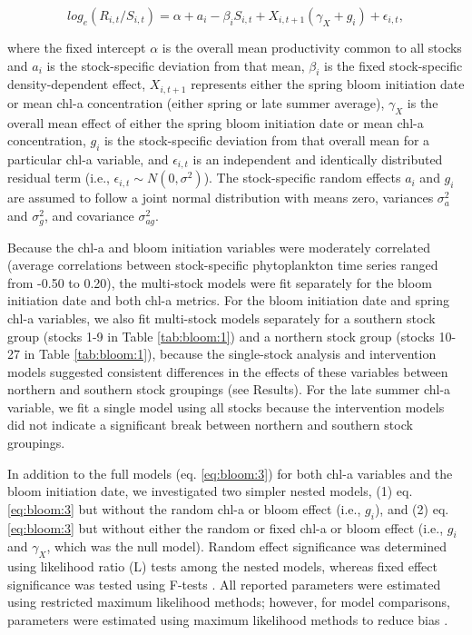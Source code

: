 \begin{equation}
log_e(R_{i,t}/S_{i,t}) = \alpha + a_i - \beta_iS_{i,t} + 
X_{i,t+1} (\gamma_{X} + g_{i}) + \epsilon_{i,t}, \label{eq:bloom:3}
\end{equation}

\noindent where the fixed intercept \(\alpha\) is the overall mean productivity
common to all stocks and \(a_i\) is the stock-specific deviation from that mean,
\(\beta_i\) is the fixed stock-specific density-dependent effect, \(X_{i,t+1}\)
represents either the spring bloom initiation date or mean chl-a concentration
(either spring or late summer average), \(\gamma_X\) is the overall mean effect
of either the spring bloom initiation date or mean chl-a concentration, \(g_i\)
is the stock-specific deviation from that overall mean for a particular chl-a
variable, and \(\epsilon_{i,t}\) is an independent and identically distributed
residual term (i.e., \(\epsilon_{i,t} \sim N(0,\sigma^2)\)).  The stock-specific
random effects \(a_i\) and \(g_i\) are assumed to follow a joint normal
distribution with means zero, variances \(\sigma^2_a\) and \(\sigma^2_g\), and
covariance \(\sigma^2_{ag}\).

Because the chl-a and bloom initiation variables were moderately correlated
(average correlations between stock-specific phytoplankton time series ranged
from -0.50 to 0.20), the multi-stock models were fit separately for the bloom
initiation date and both chl-a metrics. For the bloom initiation date and spring
chl-a variables, we also fit multi-stock models separately for a southern stock
group (stocks 1-9 in Table \ref{tab:bloom:1}) and a northern stock group (stocks
10-27 in Table \ref{tab:bloom:1}), because the single-stock analysis and
intervention models suggested consistent differences in the effects of these
variables between northern and southern stock groupings (see Results). For the
late summer chl-a variable, we fit a single model using all stocks because the
intervention models did not indicate a significant break between northern and
southern stock groupings.

In addition to the full models (eq. \ref{eq:bloom:3}) for both chl-a variables
and the bloom initiation date, we investigated two simpler nested models, (1)
eq. \ref{eq:bloom:3} but without the random chl-a or bloom effect (i.e.,
\(g_{i}\)), and (2) eq. \ref{eq:bloom:3} but without either the random or fixed
chl-a or bloom effect (i.e., \(g_{i}\) and \(\gamma_{X}\), which was the null
model).  Random effect significance was determined using likelihood ratio (L)
tests among the nested models, whereas fixed effect significance was tested
using F-tests \citep{Pinheiro2000a}. All reported parameters were estimated
using restricted maximum likelihood methods; however, for model comparisons,
parameters were estimated using maximum likelihood methods to reduce bias
\citep{Pinheiro2000a}.

